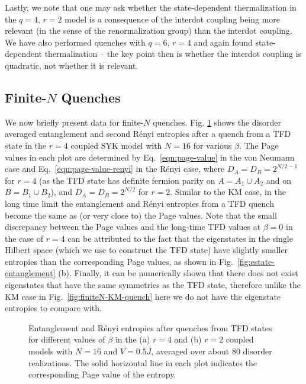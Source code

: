 \documentclass[reprint, floatfix,eqsecnum,superscriptaddress,preprint,nofootinbib,onecolumn,amsmath,amssymb,aps,prb]{revtex4-2}
\begin{document}
Lastly, we note that one may ask whether the state-dependent thermalization in the $q=4$, $r=2$ model is a consequence of the interdot coupling being more relevant (in the sense of the renormalization group) than the interdot coupling. We have also performed quenches with $q=6$, $r=4$ and again found state-dependent thermalization -- the key point then is whether the interdot coupling is quadratic, not whether it is relevant.


\subsection{Finite-$N$ Quenches}

We now briefly present data for finite-$N$ quenches. %
Fig. \ref{fig:finiteN-TFD-quench} shows the disorder averaged entanglement and second R\'enyi entropies after a quench from a TFD state in the $r=4$ coupled SYK model with $N = 16$ for various $\beta$. 
The Page values in each plot are determined by Eq.~\eqref{eqn:page-value} in the von Neumann case and Eq.~\eqref{eqn:page-value-renyi} in the R\'enyi case, where $D_A = D_B = 2^{N/2 - 1}$ for $r = 4$ (as the TFD state has definite fermion parity on $A = A_1 \cup A_2$ and on $B = B_1 \cup B_2$), and $D_A = D_B = 2^{N/2}$ for $r = 2$.
Similar to the KM case, in the long time limit the entanglement and R\'enyi entropies from a TFD quench become the same as (or very close to) the Page values. Note that the small discrepancy between the Page values and the long-time TFD values at $\beta = 0$ in the case of $r = 4$ can be attributed to the fact that the eigenstates in the single Hilbert space (which we use to construct the TFD state) have slightly smaller entropies than the corresponding Page values, as shown in Fig.~\ref{fig:estate-entanglement} (b). Finally, it can be numerically shown that there does not exist eigenstates that have the same symmetries as the TFD state, therefore unlike the KM case in Fig.~\ref{fig:finiteN-KM-quench} here we do not have the eigenstate entropies to compare with.



\begin{figure}%
 \caption{Entanglement and R\'enyi entropies after quenches from TFD states for different values of $\beta$ in the (a) $r=4$ and (b) $r = 2$ coupled models with $N=16$ and $V = 0.5J$, averaged over about 80 disorder realizations. The solid horizontal line in each plot indicates the corresponding Page value of the entropy.
 \label{fig:finiteN-TFD-quench} } 
\end{figure}
\end{document}
